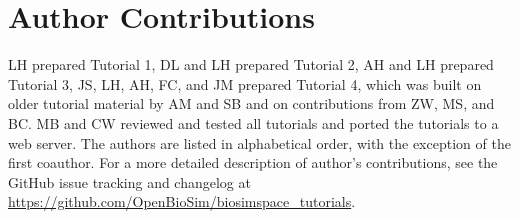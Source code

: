 \documentclass[9pt,tutorial]{livecoms}
\newcommand{\githubrepository}{\url{https://github.com/OpenBioSim/biosimspace_tutorials}}  %
\begin{document}
%
%

%

\section{Author Contributions}
%
LH prepared Tutorial 1, DL and LH prepared Tutorial 2, AH and LH prepared Tutorial 3, JS, LH, AH, FC, and JM prepared Tutorial 4, which was built on older tutorial material by AM and SB and on contributions from ZW, MS, and BC. MB and CW reviewed and tested all tutorials and ported the tutorials to a web server. The authors are listed in alphabetical order, with the exception of the first coauthor.
For a more detailed description of author's contributions,
see the GitHub issue tracking and changelog at \githubrepository.
\end{document}
